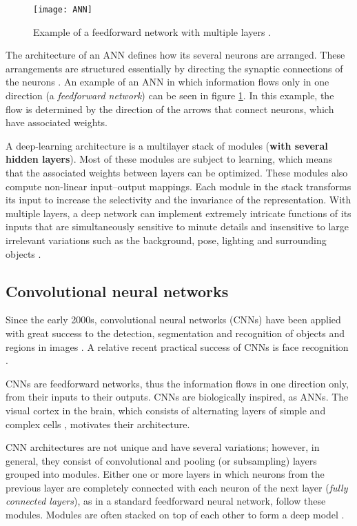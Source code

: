\begin{figure}[!h]
	\centering
	\texttt{[image: ANN]}
	\caption[Example of an ANN]
	{Example of a feedforward network with multiple layers
  \citep{daSilva2017}.}
  \label{fig:ANN}
\end{figure}

The architecture of an ANN defines how its several neurons are arranged.
These arrangements are structured essentially by directing the synaptic
connections of the neurons \citep{daSilva2017}. An example of an ANN in
which information flows only in one direction (a \textit{feedforward network})
can be seen in figure \ref{fig:ANN}. In this example, the flow is determined
by the direction of the arrows that connect neurons, which have associated
weights.

A deep-learning architecture is a multilayer stack of modules (\textbf{with
several hidden layers}). Most of these modules are subject to learning, which means
that the associated weights between layers can be optimized. These modules
also compute non-linear input–output mappings. Each module in the stack
transforms its input to increase the selectivity and the invariance of the
representation. With multiple layers, a deep network can implement extremely
intricate functions of its inputs that are simultaneously sensitive to minute
details and insensitive to large irrelevant variations such as the background,
pose, lighting and surrounding objects \citep{LeCun2015}.

\subsection{Convolutional neural networks}

Since the early 2000s, convolutional neural networks (CNNs) have been applied
with great success to the detection, segmentation and recognition of objects
and regions in images \citep{LeCun2015}. A relative recent practical success
of CNNs is face recognition \citep{Taigman2014}.

CNNs are feedforward networks, thus the information flows in one direction
only, from their inputs to their outputs. CNNs are biologically inspired,
as ANNs. The visual cortex in the brain, which consists of alternating
layers of simple and complex cells \citep{Hubel1959, Hubel1962}, motivates
their architecture.

CNN architectures are not unique and have several variations; however, in
general, they consist of convolutional and pooling (or subsampling) layers
grouped into modules. Either one or more layers in which neurons from the
previous layer are completely connected with each neuron of the next layer
(\textit{fully connected layers}), as in a standard feedforward neural
network, follow these modules. Modules are often stacked on top of each
other to form a deep model \citep{Waseem2017}.


